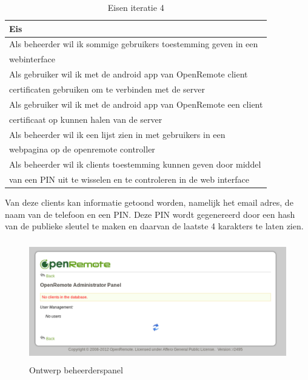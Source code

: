 \documentclass[]{article}
\begin{document}
\begin{table}[htpb]
  \caption{Eisen iteratie 4}
  \begin{center}
    \begin{tabular}{|| l ||}\hline
        Eis                                                              \\\hline\hline
        Als beheerder wil ik sommige gebruikers toestemming geven in een \\ 
        webinterface                                                     \\\hline
        Als gebruiker wil ik met de android app van OpenRemote client    \\ 
        certificaten gebruiken om te verbinden met de server             \\\hline
        Als gebruiker wil ik met de android app van OpenRemote een client\\
        certificaat op kunnen halen van de server                        \\\hline
        Als beheerder wil ik een lijst zien in met gebruikers in een     \\ 
        webpagina op de openremote controller                            \\\hline
        Als beheerder wil ik clients toestemming kunnen geven door middel\\ 
        van een PIN uit te wisselen en te controleren in de web interface\\\hline
    \end{tabular}
  \end{center}
\end{table}

Van deze clients kan informatie getoond worden, namelijk het email adres,
de naam van de telefoon en een PIN. Deze PIN wordt gegenereerd door een
hash van de publieke sleutel te maken en daarvan de laatste 4 karakters te
laten zien.

\begin{figure}[h!]
  \centering
    \includegraphics[height=150pt,keepaspectratio]{adminv1.pdf}
  \caption{Ontwerp beheerderspanel}
  \label{fig:adminv1}
\end{figure}
\end{document}
